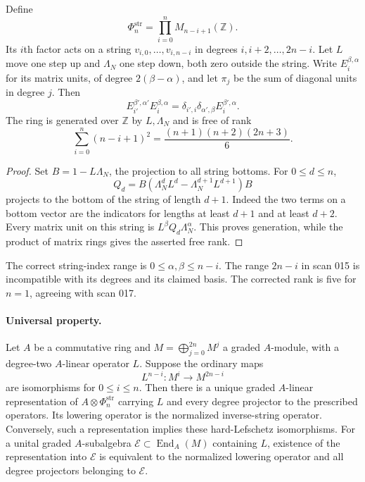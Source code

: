 Define
\[
 \Phi_n^{\mathrm{str}}=\prod_{i=0}^n M_{n-i+1}(\mathbb Z).
\]
Its $i$th factor acts on a string $v_{i,0},\ldots,v_{i,n-i}$ in degrees
$i,i+2,\ldots,2n-i$.  Let $L$ move one step up and $\Lambda_N$ one
step down, both zero outside the string.  Write $E_i^{\beta,\alpha}$
for its matrix units, of degree $2(\beta-\alpha)$, and let $\pi_j$
be the sum of diagonal units in degree $j$.  Then
\[
 E_{i'}^{\beta',\alpha'}E_i^{\beta,\alpha}
   =\delta_{i',i}\delta_{\alpha',\beta}E_i^{\beta',\alpha}.
\]
The ring is generated over $\mathbb Z$ by $L,\Lambda_N$ and is free of
rank
\[
 \sum_{i=0}^n(n-i+1)^2=\frac{(n+1)(n+2)(2n+3)}6.
\]

\begin{proof}
Set $B=1-L\Lambda_N$, the projection to all string bottoms.  For
$0\le d\le n$,
\[
 Q_d=B(\Lambda_N^dL^d-\Lambda_N^{d+1}L^{d+1})B
\]
projects to the bottom of the string of length $d+1$.  Indeed the two
terms on a bottom vector are the indicators for lengths at least $d+1$
and at least $d+2$.  Every matrix unit on this string is
$L^\beta Q_d\Lambda_N^\alpha$.  This proves generation, while the
product of matrix rings gives the asserted free rank.
\end{proof}

The correct string-index range is $0\le\alpha,\beta\le n-i$.
The range $2n-i$ in scan 015 is incompatible with its degrees and its
claimed basis.  The corrected rank is five for $n=1$, agreeing with
scan 017.

\paragraph{Universal property.}
Let $A$ be a commutative ring and $M=\bigoplus_{j=0}^{2n}M^j$ a graded
$A$-module, with a degree-two $A$-linear operator $L$.  Suppose the ordinary
maps
\[
 L^{n-i}:M^i\longrightarrow M^{2n-i}
\]
are isomorphisms for $0\le i\le n$.  Then there is a unique graded
$A$-linear representation of $A\otimes\Phi_n^{\mathrm{str}}$ carrying
$L$ and every degree projector to the prescribed operators.  Its lowering
operator is the normalized inverse-string operator.  Conversely, such a
representation implies these hard-Lefschetz isomorphisms.  For a
unital graded $A$-subalgebra $\mathcal E\subset\operatorname{End}_A(M)$
containing $L$, existence of the
representation into $\mathcal E$ is equivalent to the normalized lowering
operator and all degree projectors belonging to $\mathcal E$.

